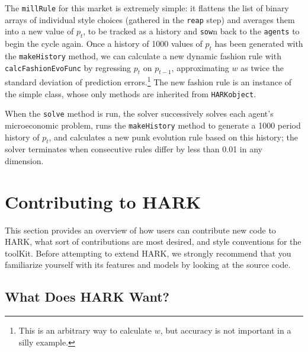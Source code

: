 \documentclass[12pt,titlepage,letterpaper]{econtex}
\begin{document}
{The \texttt{millRule} for this market is extremely simple: it flattens the list of binary arrays of individual style choices (gathered in the \texttt{reap} step) and averages them into a new value of $p_t$, to be tracked as a history and \texttt{sow}n back to the \texttt{agents} to begin the cycle again.  Once a history of 1000 values of $p_t$ has been generated with the \texttt{makeHistory} method, we can calculate a new dynamic fashion rule with \texttt{calcFashionEvoFunc} by regressing $p_t$ on $p_{t-1}$, approximating $w$ as twice the standard deviation of prediction errors.\footnote{This is an arbitrary way to calculate $w$, but accuracy is not important in a silly example.}  The new fashion rule is an instance of the simple  class, whose only methods are inherited from \texttt{HARKobject}.

When the \texttt{solve} method is run, the solver successively solves each agent's microeconomic problem, runs the \texttt{makeHistory} method to generate a 1000 period history of $p_t$, and calculates a new punk evolution rule based on this history; the solver terminates when consecutive rules differ by less than 0.01 in any dimension.

}
\section{Contributing to HARK}\label{sec:ContributingToHARK}

This section provides an overview of how users can contribute new code to HARK, what sort of contributions are most desired, and style conventions for the toolKit.  Before attempting to extend HARK, we strongly recommend that you familiarize yourself with its features and models by looking at the source code.

\subsection{What Does HARK Want?}\label{sec:WhatDoesHARKWant}
\end{document}
